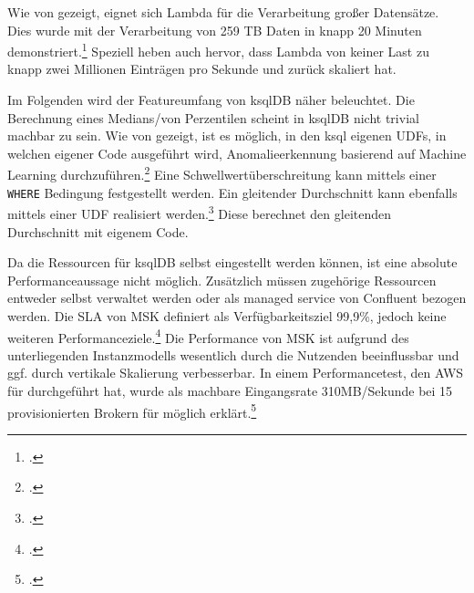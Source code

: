 Wie von \citeauthor{Madden.2019} gezeigt, eignet sich Lambda für die Verarbeitung großer Datensätze. 
Dies wurde mit der Verarbeitung von 259 TB Daten in knapp 20 Minuten demonstriert.\footcite[Vgl. auch im Folgenden][]{Madden.2019} Speziell heben \citeauthor{Madden.2019} auch hervor, dass Lambda von keiner Last zu knapp zwei Millionen Einträgen pro Sekunde und zurück skaliert hat.


\label{anhang:vergleich-msk}
Im Folgenden wird der Featureumfang von ksqlDB näher beleuchtet.
Die Berechnung eines Medians/von Perzentilen scheint in ksqlDB nicht trivial machbar zu sein.
Wie von \citeauthor{Waehner.2018} gezeigt, ist es möglich, in den ksql eigenen \acp{UDF}, in welchen eigener Code ausgeführt wird, Anomalieerkennung basierend auf Machine Learning durchzuführen.\footcite[Vgl.][]{Waehner.2018}
Eine Schwellwertüberschreitung kann mittels einer \texttt{WHERE} Bedingung festgestellt werden.
Ein gleitender Durchschnitt kann ebenfalls mittels einer \ac{UDF} realisiert werden.\footcite[Vgl.][]{ConfluentInc..o.J.c} 
Diese berechnet den gleitenden Durchschnitt mit eigenem Code.

Da die Ressourcen für ksqlDB selbst eingestellt werden können, ist eine absolute Performanceaussage nicht möglich. Zusätzlich müssen zugehörige Ressourcen entweder selbst verwaltet werden oder als managed service von Confluent bezogen werden.
Die \ac{SLA} von \ac{MSK} definiert als Verfügbarkeitsziel 99,9\%, jedoch keine weiteren Performanceziele.\footcite[Vgl.][]{AmazonWebServicesInc..2019e} 
Die Performance von \ac{MSK} ist aufgrund des unterliegenden Instanzmodells wesentlich durch die Nutzenden beeinflussbar und ggf. durch vertikale Skalierung verbesserbar.
In einem Performancetest, den \ac{AWS} für \citeauthor{Statz.2019} durchgeführt hat, wurde als machbare Eingangsrate 310MB/Sekunde bei 15 provisionierten Brokern für möglich erklärt.\footcite[Vgl.][]{Statz.2019} 